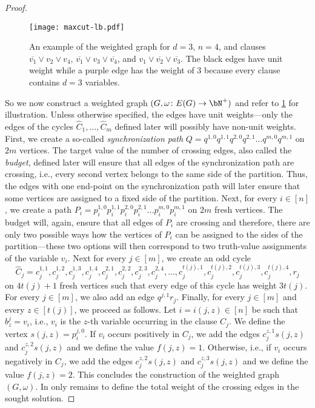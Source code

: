 \documentclass[a4paper,UKenglish,cleveref, autoref, thm-restate]{lipics-v2021}
\begin{document}
\begin{proof}
    
    \begin{figure}[t]
        \centering
        \texttt{[image: maxcut-lb.pdf]}
        \caption{An example of the weighted graph for $d = 3$, $n = 4$, and clauses $\overline{v_1} \lor v_2 \lor v_4$, $\overline{v_1} \lor v_3 \lor \overline{v_4}$, and $v_1 \lor \overline{v_2} \lor \overline{v_3}$. The black edges have unit weight while a purple edge has the weight of 3 because every clause contains $d = 3$ variables.}
        \label{fig:maxcut-lb}
    \end{figure}
    
    So we now construct a weighted graph $(G, \omega \colon E(G) \to \bN^+)$ and refer to \cref{fig:maxcut-lb} for illustration. 
    Unless otherwise specified, the edges have unit weights---only the edges of the cycles $\hat C_1, \dots, \hat C_m$ defined later will possibly have non-unit weights.
    First, we create a so-called \emph{synchronization path} $Q = q^{1,0} q^{1,1} q^{2,0} q^{2,1} \dots q^{m,0} q^{m,1}$ on $2m$ vertices. 
    The target value of the number of crossing edges, also called the \emph{budget}, defined later will ensure that all edges of the synchronization path are crossing, i.e., every second vertex belongs to the same side of the partition.  
    Thus, the edges with one end-point on the synchronization path will later ensure that some vertices are assigned to a fixed side of the partition.
    Next, for every $i \in [n]$, we create a path $P_i = p_i^{1,0} p_i^{1,1} p_i^{2,0} p_i^{2,1} \dots p_i^{m,0} p_i^{m,1}$ on $2m$ fresh vertices.
    The budget will, again, ensure that all edges of $P_i$ are crossing and therefore, there are only two possible ways how the vertices of $P_i$ can be assigned to the sides of the partition---these two options will then correspond to two truth-value assignments of the variable $v_i$.
    Next for every $j \in [m]$, we create an odd cycle 
    \[  
        \hat C_j = c_j^{1,1}, c_j^{1,2}, c_j^{1,3}, c_j^{1,4}, c_j^{2,1}, c_j^{2,2}, c_j^{2,3}, c_j^{2,4}, \dots, c_j^{t(j),1}, c_j^{t(j),2}, c_j^{t(j),3}, c_j^{t(j),4}, r_j
    \]
    on $4t(j)+1$ fresh vertices such that every edge of this cycle has weight $3t(j)$. 
    For every $j \in [m]$, we also add an edge $q^{j,1} r_j$. 
    Finally, for every $j \in [m]$ and every $z \in [t(j)]$, we proceed as follows. 
    Let $i = i(j, z) \in [n]$ be such that $b^j_z = v_i$, i.e., $v_i$ is the $z$-th variable occurring in the clause $C_j$.
    We define the vertex $s(j, z) = p_i^{j, 0}$.
    If $v_i$ occurs positively in $C_j$, we add the edges $c_j^{z, 1} s(j, z)$ and $c_j^{z, 2} s(j, z)$ and we define the value $f(j,z) = 1$. 
    Otherwise, i.e., if $v_i$ occurs negatively in $C_j$, we add the edges $c_j^{z, 2} s(j, z)$ and $c_j^{z, 3} s(j, z)$ and we define the value $f(j,z) = 2$. 
    This concludes the construction of the weighted graph $(G, \omega)$.
    In only remains to define the total weight of the crossing edges in the sought solution.


\end{proof}
\end{document}
